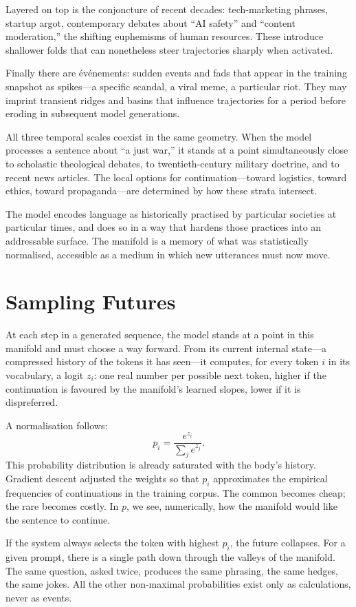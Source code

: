 \documentclass[12pt,a4paper]{article}
\begin{document}
Layered on top is the conjoncture of recent decades: tech-marketing phrases, startup argot, contemporary debates about ``AI safety'' and ``content moderation,'' the shifting euphemisms of human resources. These introduce shallower folds that can nonetheless steer trajectories sharply when activated.

Finally there are événements: sudden events and fads that appear in the training snapshot as spikes---a specific scandal, a viral meme, a particular riot. They may imprint transient ridges and basins that influence trajectories for a period before eroding in subsequent model generations.

All three temporal scales coexist in the same geometry. When the model processes a sentence about ``a just war,'' it stands at a point simultaneously close to scholastic theological debates, to twentieth-century military doctrine, and to recent news articles. The local options for continuation---toward logistics, toward ethics, toward propaganda---are determined by how these strata intersect.

The model encodes language as historically practised by particular societies at particular times, and does so in a way that hardens those practices into an addressable surface. The manifold is a memory of what was statistically normalised, accessible as a medium in which new utterances must now move.

\section{Sampling Futures}

At each step in a generated sequence, the model stands at a point in this manifold and must choose a way forward. From its current internal state---a compressed history of the tokens it has seen---it computes, for every token $i$ in its vocabulary, a logit $z_i$: one real number per possible next token, higher if the continuation is favoured by the manifold's learned slopes, lower if it is dispreferred.

A normalisation follows:
\[
p_i = \frac{e^{z_i}}{\sum_j e^{z_j}}.
\]
This probability distribution is already saturated with the body's history. Gradient descent adjusted the weights so that $p_i$ approximates the empirical frequencies of continuations in the training corpus. The common becomes cheap; the rare becomes costly. In $p$, we see, numerically, how the manifold would like the sentence to continue.

If the system always selects the token with highest $p_i$, the future collapses. For a given prompt, there is a single path down through the valleys of the manifold. The same question, asked twice, produces the same phrasing, the same hedges, the same jokes. All the other non-maximal probabilities exist only as calculations, never as events.
\end{document}
